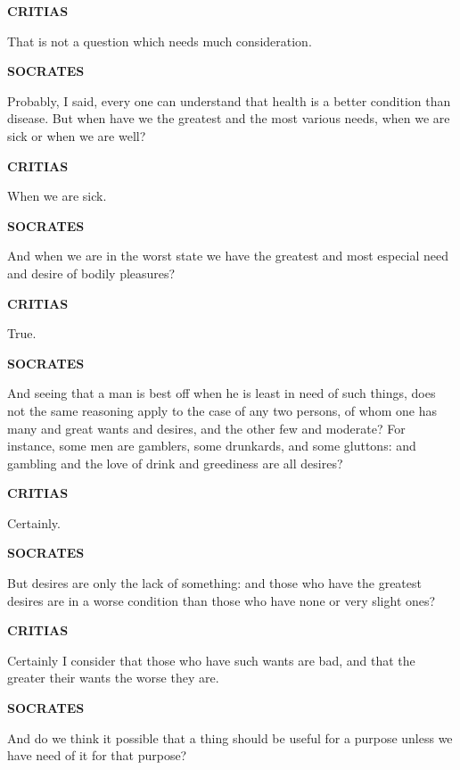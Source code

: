 \documentclass[11pt,letter]{article}
\begin{document}
\par \textbf{CRITIAS}
\par   That is not a question which needs much consideration.

\par \textbf{SOCRATES}
\par   Probably, I said, every one can understand that health is a better condition than disease. But when have we the greatest and the most various needs, when we are sick or when we are well?

\par \textbf{CRITIAS}
\par   When we are sick.

\par \textbf{SOCRATES}
\par   And when we are in the worst state we have the greatest and most especial need and desire of bodily pleasures?

\par \textbf{CRITIAS}
\par   True.

\par \textbf{SOCRATES}
\par   And seeing that a man is best off when he is least in need of such things, does not the same reasoning apply to the case of any two persons, of whom one has many and great wants and desires, and the other few and moderate? For instance, some men are gamblers, some drunkards, and some gluttons:  and gambling and the love of drink and greediness are all desires?

\par \textbf{CRITIAS}
\par   Certainly.

\par \textbf{SOCRATES}
\par   But desires are only the lack of something:  and those who have the greatest desires are in a worse condition than those who have none or very slight ones?

\par \textbf{CRITIAS}
\par   Certainly I consider that those who have such wants are bad, and that the greater their wants the worse they are.

\par \textbf{SOCRATES}
\par   And do we think it possible that a thing should be useful for a purpose unless we have need of it for that purpose?
\end{document}
